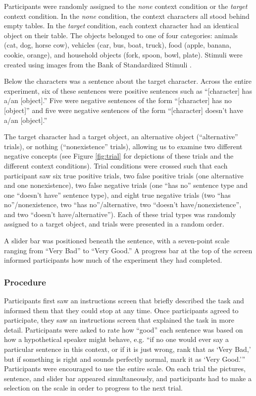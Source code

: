 \documentclass[man, noapacite]{apa2}
\begin{document}
Participants were randomly assigned to the \emph{none} context condition or the \emph{target} context condition.  In the \emph{none} condition, the context characters all stood behind empty tables.  In the \emph{target} condition, each context character had an identical object on their table.  The objects belonged to one of four categories: animals (cat, dog, horse cow), vehicles (car, bus, boat, truck), food (apple, banana, cookie, orange), and household objects (fork, spoon, bowl, plate).  Stimuli were created using images from the Bank of Standardized Stimuli \cite{brodeur2010}.  

Below the characters was a sentence about the target character.  Across the entire experiment, six of these sentences were positive sentences such as ``[character] has a/an [object].''  Five were negative sentences of the form ``[character] has no [object]'' and five were negative sentences of the form ``[character] doesn't have a/an [object].'' 

The target character had a target object, an alternative object (``alternative'' trials), or nothing (``nonexistence'' trials), allowing us to examine two different negative concepts (see Figure \ref{fig:trial} for depictions of these trials and the different context conditions).    Trial conditions were crossed such that each participant saw six true positive trials, two false positive trials (one alternative and one nonexistence), two false negative trials (one ``has no'' sentence type and one ``doesn't have'' sentence type), and eight true negative trials (two ``has no''/nonexistence, two ``has no''/alternative, two ``doesn't have/nonexistence'', and two ``doesn't have/alternative'').  Each of these trial types was randomly assigned to a target object, and trials were presented in a random order.  

A slider bar was positioned beneath the sentence, with a seven-point scale ranging from ``Very Bad'' to ``Very Good.''  A progress bar at the top of the screen informed participants how much of the experiment they had completed. 

\vspace{.2cm}

\subsubsection{Procedure}

Participants first saw an instructions screen that briefly described the task and informed them that they could stop at any time.  Once participants agreed to participate, they saw an instructions screen that explained the task in more detail.  Participants were asked to rate how ``good'' each sentence was based on how a hypothetical speaker might behave, e.g. ``if no one would ever say a particular sentence in this context, or if it is just wrong, rank that as `Very Bad,' but if something is right and sounds perfectly normal, mark it as `Very Good.''' Participants were encouraged to use the entire scale. On each trial the pictures, sentence, and slider bar appeared simultaneously, and participants had to make a selection on the scale in order to progress to the next trial.  
\end{document}
